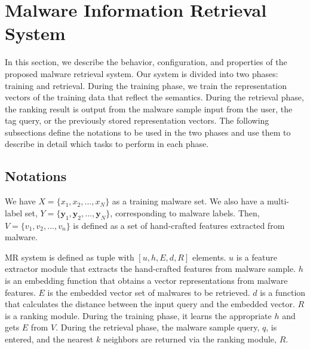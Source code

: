 \section{Malware Information Retrieval System}
In this section, we describe the behavior, configuration, and properties of the proposed malware retrieval system. Our system is divided into two phases: training and retrieval. During the training phase, we train the representation vectors of the training data that reflect the semantics. During the retrieval phase, the ranking result is output from the malware sample input from the user, the tag query, or the previously stored representation vectors. The following subsections define the notations to be used in the two phases and use them to describe in detail which tasks to perform in each phase.

\subsection{Notations}
We have $X = \{x_1, x_2, ..., x_N\}$ as a training malware set. We also have a multi-label set, $Y = \{\mathbf{y}_{1}, \mathbf{y}_{2}, ... , \mathbf{y}_{N}\}$, corresponding to malware labels. Then, $V = \{v_1, v_2, ..., v_n \}$ is defined as a set of hand-crafted features extracted from malware.

MR system is defined as tuple with $[u, h, E, d, R]$ elements. $u$ is a feature extractor module that extracts the hand-crafted features from malware sample. $h$ is an embedding function that obtains a vector representations from malware features. $E$ is the embedded vector set of malwares to be retrieved. $d$ is a function that calculates the distance between the input query and the embedded vector. $R$ is a ranking module. During the training phase, it learns the appropriate $h$ and gets $E$ from $V$. During the retrieval phase, the malware sample query, $q$, is entered, and the nearest $k$ neighbors are returned via the ranking module, $R$.


